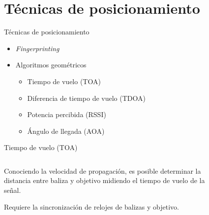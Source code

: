 \documentclass[xcolor=table]{beamer}
\begin{document}
  \section{Técnicas de posicionamiento}

    \begin{frame}{Técnicas de posicionamiento}
    \begin{itemize}
      \item \textit{Fingerprinting}
      \item Algoritmos geométricos
      \begin{itemize}
        \item Tiempo de vuelo (TOA)
        \item Diferencia de tiempo de vuelo (TDOA)
        \item Potencia percibida (RSSI)
        \item Ángulo de llegada (AOA)
      \end{itemize}
    \end{itemize}
    \end{frame}



    \begin{frame}{Tiempo de vuelo (TOA)}
      \begin{columns}
        \begin{column}{0.5\textwidth}
          Conociendo la velocidad de propagación, es posible determinar la distancia entre baliza y objetivo midiendo el tiempo de vuelo de la señal.

          \vspace{.5cm}
          Requiere la sincronización de relojes de balizas y objetivo.
        \end{column}
        \begin{column}{0.5\textwidth}  
          \begin{figure}[H]
            \centering
            \def\svgwidth{\linewidth}
            
            \label{fig:TOA}
        \end{figure}
        \end{column}
      \end{columns}
    \end{frame}
\end{document}

